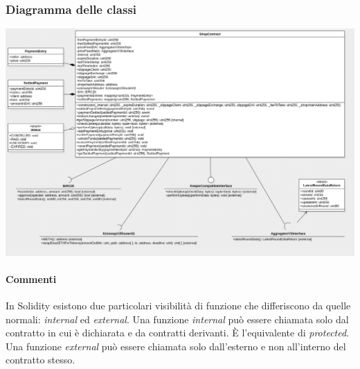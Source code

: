 \documentclass[a4paper, 12pt]{article}
\begin{document}
\subsubsection{Diagramma delle classi}
\includegraphics[width=1.0\textwidth]{contract}
\paragraph{Commenti}
In Solidity esistono due particolari visibilità di funzione che differiscono da quelle normali: \textit{internal} ed \textit{external}.
Una funzione \textit{internal} può essere chiamata solo dal contratto in cui è dichiarata e da contratti derivanti.
È l'equivalente di \textit{protected}.
Una funzione \textit{external} può essere chiamata solo dall'esterno e non all'interno del contratto stesso.
\end{document}
